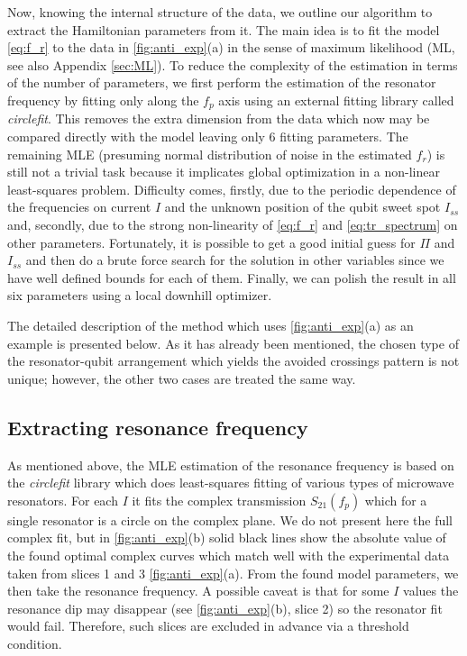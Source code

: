 \documentclass[%
 aip,
 draft,
 amsmath,amssymb,
 reprint,%
]{revtex4-1}
\begin{document}
Now, knowing the internal structure of the data, we outline our algorithm to extract the Hamiltonian parameters from it. The main idea is to fit the model \eqref{eq:f_r} to the data in \autoref{fig:anti_exp}(a) in the sense of maximum likelihood\cite{bishop2006} (ML, see also Appendix \ref{sec:ML}). To reduce the complexity of the estimation in terms of the number of parameters, we first perform the estimation of the resonator frequency by fitting only along the $f_p$ axis using an external fitting library called \textit{circlefit}\cite{probst2015}. This removes the extra dimension from the data which now may be compared directly with the model leaving only 6 fitting parameters. The remaining MLE (presuming normal distribution of noise in the estimated $f_r$) is still not a trivial task because it implicates global optimization in a non-linear least-squares problem. Difficulty comes, firstly, due to the periodic dependence of the frequencies on current $I$ and the unknown position of the qubit sweet spot $I_{ss}$ and, secondly, due to the strong non-linearity of \eqref{eq:f_r} and \eqref{eq:tr_spectrum} on other parameters. Fortunately, it is possible to get a good initial guess for $\Pi$ and $I_{ss}$ and then do a brute force search for the solution in other variables since we have well defined bounds for each of them. Finally, we can polish the result in all six parameters using a local downhill optimizer.

The detailed description of the method which uses \autoref{fig:anti_exp}(a) as an example is presented below. As it has already been mentioned, the chosen type of the resonator-qubit arrangement which yields the avoided crossings pattern is not unique; however, the other two cases are treated the same way.

\subsection{Extracting resonance frequency}\label{sec:extract_fr}

As mentioned above, the MLE estimation of the resonance frequency is based on the \textit{circlefit} library which does least-squares fitting of various types of microwave resonators. For each $I$ it fits the complex transmission $S_{21}(f_p)$ which for a single resonator is a circle on the complex plane\cite{probst2015}. We do not present here the full complex fit, but in \autoref{fig:anti_exp}(b) solid black lines show the absolute value of the found optimal complex curves which match well with the experimental data taken from slices 1 and 3 \autoref{fig:anti_exp}(a). From the found model parameters, we then take the resonance frequency. A possible caveat is that for some $I$ values the resonance dip may disappear (see \autoref{fig:anti_exp}(b), slice 2) so the resonator fit would fail. Therefore, such slices are excluded in advance via a threshold condition.
\end{document}
